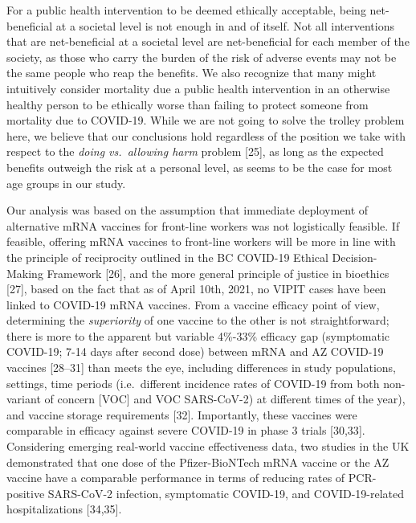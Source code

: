 \documentclass[]{elsarticle} %
\begin{document}
For a public health intervention to be deemed ethically acceptable,
being net-beneficial at a societal level is not enough in and of itself.
Not all interventions that are net-beneficial at a societal level are
net-beneficial for each member of the society, as those who carry the
burden of the risk of adverse events may not be the same people who reap
the benefits. We also recognize that many might intuitively consider
mortality due a public health intervention in an otherwise healthy
person to be ethically worse than failing to protect someone from
mortality due to COVID-19. While we are not going to solve the trolley
problem here, we believe that our conclusions hold regardless of the
position we take with respect to the \emph{doing vs.~allowing harm}
problem {[}25{]}, as long as the expected benefits outweigh the risk at
a personal level, as seems to be the case for most age groups in our
study.

Our analysis was based on the assumption that immediate deployment of
alternative mRNA vaccines for front-line workers was not logistically
feasible. If feasible, offering mRNA vaccines to front-line workers will
be more in line with the principle of reciprocity outlined in the BC
COVID-19 Ethical Decision-Making Framework {[}26{]}, and the more
general principle of justice in bioethics {[}27{]}, based on the fact
that as of April 10th, 2021, no VIPIT cases have been linked to COVID-19
mRNA vaccines. From a vaccine efficacy point of view, determining the
\emph{superiority} of one vaccine to the other is not straightforward;
there is more to the apparent but variable 4\%-33\% efficacy gap
(symptomatic COVID-19; 7-14 days after second dose) between mRNA and AZ
COVID-19 vaccines {[}28--31{]} than meets the eye, including differences
in study populations, settings, time periods (i.e.~different incidence
rates of COVID-19 from both non-variant of concern {[}VOC{]} and VOC
SARS-CoV-2) at different times of the year), and vaccine storage
requirements {[}32{]}. Importantly, these vaccines were comparable in
efficacy against severe COVID-19 in phase 3 trials {[}30,33{]}.
Considering emerging real-world vaccine effectiveness data, two studies
in the UK demonstrated that one dose of the Pfizer-BioNTech mRNA vaccine
or the AZ vaccine have a comparable performance in terms of reducing
rates of PCR-positive SARS-CoV-2 infection, symptomatic COVID-19, and
COVID-19-related hospitalizations {[}34,35{]}.
\end{document}
